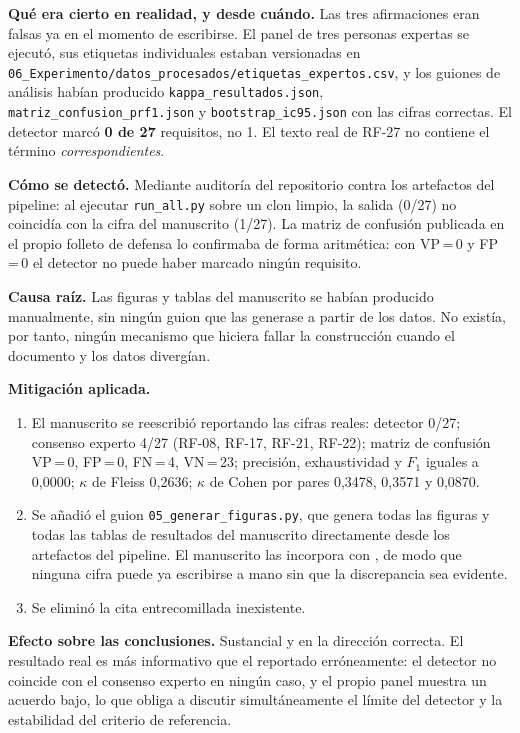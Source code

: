 \documentclass[11pt,a4paper]{article}
\begin{document}
\textbf{Qué era cierto en realidad, y desde cuándo.} Las tres afirmaciones eran
falsas ya en el momento de escribirse. El panel de tres personas expertas se
ejecutó, sus etiquetas individuales estaban versionadas en
\texttt{06\_Experimento/datos\_procesados/etiquetas\_expertos.csv}, y los
guiones de análisis habían producido \texttt{kappa\_resultados.json},
\texttt{matriz\_confusion\_prf1.json} y \texttt{bootstrap\_ic95.json} con las
cifras correctas. El detector marcó \textbf{0 de 27} requisitos, no 1. El texto
real de RF-27 no contiene el término \textit{correspondientes}.

\textbf{Cómo se detectó.} Mediante auditoría del repositorio contra los
artefactos del pipeline: al ejecutar \texttt{run\_all.py} sobre un clon limpio,
la salida (0/27) no coincidía con la cifra del manuscrito (1/27). La matriz de
confusión publicada en el propio folleto de defensa lo confirmaba de forma
aritmética: con VP\,=\,0 y FP\,=\,0 el detector no puede haber marcado ningún
requisito.

\textbf{Causa raíz.} Las figuras y tablas del manuscrito se habían producido
manualmente, sin ningún guion que las generase a partir de los datos. No
existía, por tanto, ningún mecanismo que hiciera fallar la construcción cuando
el documento y los datos divergían.

\textbf{Mitigación aplicada.}
\begin{enumerate}
\item El manuscrito se reescribió reportando las cifras reales: detector 0/27;
      consenso experto 4/27 (RF-08, RF-17, RF-21, RF-22); matriz de confusión
      VP\,=\,0, FP\,=\,0, FN\,=\,4, VN\,=\,23; precisión, exhaustividad y
      $F_1$ iguales a 0,0000; $\kappa$ de Fleiss 0,2636; $\kappa$ de Cohen por
      pares 0,3478, 0,3571 y 0,0870.
\item Se añadió el guion \texttt{05\_generar\_figuras.py}, que genera todas las
      figuras y todas las tablas de resultados del manuscrito directamente
      desde los artefactos del pipeline. El manuscrito las incorpora con
      \verb||, de modo que ninguna cifra puede ya escribirse a mano sin
      que la discrepancia sea evidente.
\item Se eliminó la cita entrecomillada inexistente.
\end{enumerate}

\textbf{Efecto sobre las conclusiones.} Sustancial y en la dirección correcta.
El resultado real es más informativo que el reportado erróneamente: el detector
no coincide con el consenso experto en ningún caso, y el propio panel muestra
un acuerdo bajo, lo que obliga a discutir simultáneamente el límite del
detector y la estabilidad del criterio de referencia.
\end{document}
